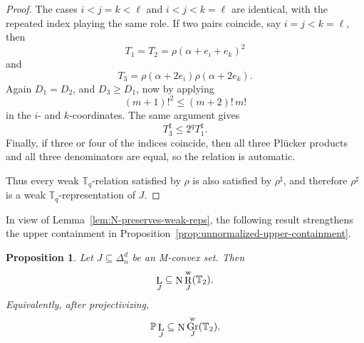 \documentclass[12pt]{amsart}
\newtheorem{proposition}[theorem]{Proposition}
\theoremstyle{definition}
\newcommand{\1}{\mathbf{1}}
\DeclareMathOperator{\upN}{N}   %
\DeclareMathOperator{\upL}{L}   %
\DeclareMathOperator{\upR}{R}   %
\DeclareMathOperator{\Gr}{Gr}
\newcommand\T{{\mathbb T}}
\begin{document}
\begin{proof}
The cases $i<j=k<\ell$ and $i<j<k=\ell$ are identical, with the repeated
index playing the same role.  If two pairs coincide, say $i=j<k=\ell$, then
\[
T_1=T_2=\rho(\alpha+e_i+e_k)^2
\]
and
\[
T_3=\rho(\alpha+2e_i)\rho(\alpha+2e_k).
\]
Again $D_1=D_2$, and $D_3\ge D_1$, now by applying
\[
(m+1)!^2\le (m+2)!\,m!
\]
in the $i$- and $k$-coordinates.  The same argument gives
\[
T_3^\sharp\le 2^qT_1^\sharp.
\]
Finally, if three or four of the indices coincide, then all three Plücker
products and all three denominators are equal, so the relation is automatic.

Thus every weak $\T_q$-relation satisfied by $\rho$ is also satisfied by
$\rho^\sharp$, and therefore $\rho^\sharp$ is a weak
$\T_q$-representation of $J$.
\end{proof}

In view of Lemma~\ref{lem:N-preserves-weak-reps}, the following result strengthens the upper containment in
Proposition~\ref{prop:unnormalized-upper-containment}.

\begin{proposition}
\label{prop:normalized-upper}
Let $J\subseteq \Delta_n^d$ be an M-convex set. Then
\[
\upL_J \subseteq \upN \upR_J^{\rm w}(\T_2).
\]
Equivalently, after projectivizing,
\[
\mathbb P \upL_J \subseteq \upN \Gr_J^{\rm w}(\T_2).
\]
\end{proposition}
\end{document}
